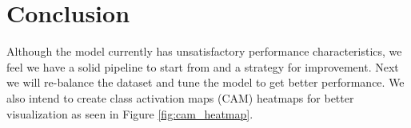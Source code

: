 \documentclass{amia}
\begin{document}
\section*{Conclusion}
Although the model currently has unsatisfactory performance characteristics, we feel we have a solid pipeline to start from and a strategy for improvement. Next we will re-balance the dataset and tune the model to get better performance. We also intend to create class activation maps (CAM) heatmaps for better visualization as seen in Figure \ref{fig:cam_heatmap}.

\makeatletter

\let\oldsection\section
\renewcommand\section{\clearpage\oldsection}


\renewcommand{\@biblabel}[1]{\hfill #1.}
\makeatother
\end{document}
